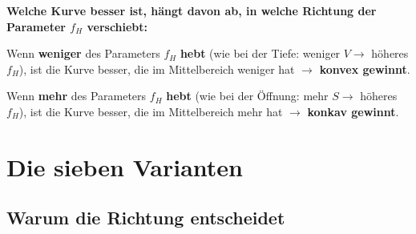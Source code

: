 \documentclass[11pt,a4paper]{article}
\begin{document}
\begin{warnbox}
\textbf{Welche Kurve besser ist, hängt davon ab, in welche Richtung der Parameter $f_H$ verschiebt:}

Wenn \textbf{weniger} des Parameters $f_H$ \textbf{hebt} (wie bei der Tiefe: weniger $V \to$ höheres $f_H$), ist die Kurve besser, die im Mittelbereich weniger hat $\to$ \textbf{konvex gewinnt}.

Wenn \textbf{mehr} des Parameters $f_H$ \textbf{hebt} (wie bei der Öffnung: mehr $S \to$ höheres $f_H$), ist die Kurve besser, die im Mittelbereich mehr hat $\to$ \textbf{konkav gewinnt}.
\end{warnbox}


\section{Die sieben Varianten}

\begin{table}[H]
\centering\small
{}
\caption{Die sieben Varianten. Obere Gruppe: Tiefe variiert. Untere Gruppe: Öffnung variiert.}
\end{table}

\subsection{Warum die Richtung entscheidet}
\end{document}
